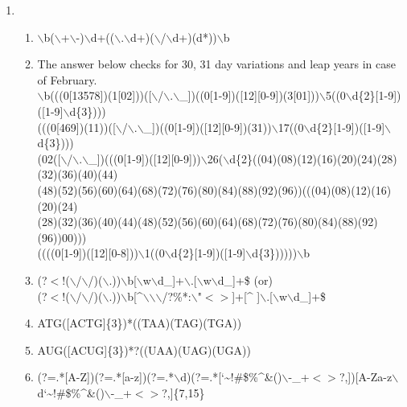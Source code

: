 \documentclass[11pt,a4paper]{article}
\begin{document}
\begin{enumerate}
\vspace{0.5em}

\item{
\begin{enumerate}
\item {$\backslash$b($\backslash$+\textbar$\backslash$-\textbar  )$\backslash$d+(($\backslash$.$\backslash$d+)\textbar($\backslash$/$\backslash$d+)\textbar (d*))$\backslash$b}
\item { The answer below checks for 30, 31 day variations and leap years in case of February. \\
$\backslash$b(((0[13578])\textbar(1[02]))([$\backslash$/$\backslash$.$\backslash$\_])((0[1-9])\textbar([12][0-9])\textbar(3[01]))$\backslash$5((0$\backslash$d\{2\}[1-9])\textbar([1-9]$\backslash$d\{3\})))\textbar\\(((0[469])\textbar(11))([$\backslash$/$\backslash$.$\backslash$\_])((0[1-9])\textbar([12][0-9])\textbar(31))$\backslash$17((0$\backslash$d\{2\}[1-9])\textbar([1-9]$\backslash$d\{3\})))\textbar\\(02([$\backslash$/$\backslash$.$\backslash$\_])(((0[1-9])\textbar([12][0-9]))$\backslash$26($\backslash$d\{2\}((04)\textbar(08)\textbar(12)\textbar(16)\textbar(20)\textbar(24)\textbar(28)\textbar(32)\textbar(36)\textbar(40)\textbar(44)\\\textbar(48)\textbar(52)\textbar(56)\textbar(60)\textbar(64)\textbar(68)\textbar(72)\textbar(76)\textbar(80)\textbar(84)\textbar(88)\textbar(92)\textbar(96))\textbar(((04)\textbar(08)\textbar(12)\textbar(16)\textbar(20)\textbar(24)\textbar\\(28)\textbar(32)\textbar(36)\textbar(40)\textbar(44)\textbar(48)\textbar(52)\textbar(56)\textbar(60)\textbar(64)\textbar(68)\textbar(72)\textbar(76)\textbar(80)\textbar(84)\textbar(88)\textbar(92)\textbar(96))00)))\textbar\\((((0[1-9])\textbar([12][0-8]))$\backslash$1((0$\backslash$d\{2\}[1-9])\textbar([1-9]$\backslash$d\{3\})))))$\backslash$b}
\item {(?$<$!($\backslash$/$\backslash$/)\textbar($\backslash$.))$\backslash$b[$\backslash$w$\backslash$d\_]+$\backslash$.[$\backslash$w$\backslash$d\_]+\$ (or) \\
(?$<$!($\backslash$/$\backslash$/)\textbar($\backslash$.))$\backslash$b[\string^$\backslash${$\backslash$}{$\backslash$}/?\%*:$\backslash$\textbar"$<>$]+[\string^{} ]$\backslash$.[$\backslash$w$\backslash$d\_]+\$}
\item {ATG([ACTG]\{3\})*((TAA)\textbar(TAG)\textbar(TGA))}
\item{ AUG([ACUG]\{3\})*?((UAA)\textbar(UAG)\textbar(UGA))}
\item {(?=.*[A-Z])(?=.*[a-z])(?=.*$\backslash$d)(?=.*[\char`\~{}!\#\$\%\string^{}\&()$\backslash$-\_+$<>$?,])[A-Za-z$\backslash$d\char`\~{}!\#\$\%\string^{}\&()$\backslash$-\_+$<>$?,]\{7,15\}}
\end{enumerate}}

\end{enumerate}
\end{document}
